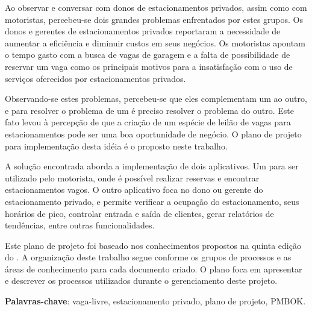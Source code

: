 \setlength{\absparsep}{18pt} %
\begin{resumo}

Ao observar e conversar com donos de estacionamentos privados, assim como com motoristas, percebeu-se dois grandes problemas enfrentados por estes grupos. Os donos e gerentes de estacionamentos privados reportaram a necessidade de aumentar a eficiência e diminuir custos em seus negócios. Os motoristas apontam o tempo gasto com a busca de vagas de garagem e a falta de possibilidade de reservar um vaga como os principais motivos para a insatisfação com o uso de serviços oferecidos por estacionamentos privados. 

Observando-se estes problemas, percebeu-se que eles complementam um ao outro, e para resolver o problema de um é preciso resolver o problema do outro. Este fato levou à percepção de que a criação de um espécie de leilão de vagas para estacionamentos pode ser uma boa oportunidade de negócio. O plano de projeto para implementação desta idéia é o proposto neste trabalho. 

A solução encontrada aborda a implementação de dois aplicativos. Um para ser utilizado pelo motorista, onde é possível realizar reservas e encontrar estacionamentos vagos. O outro aplicativo foca no dono ou gerente do estacionamento privado, e permite verificar a ocupação do estacionamento, seus horários de pico, controlar entrada e saída de clientes, gerar relatórios de tendências, entre outras funcionalidades.

Este plano de projeto foi baseado nos conhecimentos propostos na quinta edição do \cite{project2013guia}. A organização deste trabalho segue conforme os grupos de processos e as áreas de conhecimento para cada documento criado. O plano foca em apresentar e descrever os processos utilizados durante o gerenciamento deste projeto.

 \textbf{Palavras-chave}: vaga-livre, estacionamento privado, plano de projeto, PMBOK.
\end{resumo}